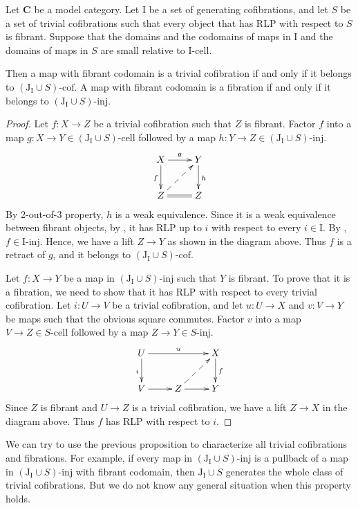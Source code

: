 \documentclass{tac}
\theoremstyle{definition}
\newcommand{\cat}[1]{\mathbf{#1}}
\newcommand{\C}{\cat{C}}
\newcommand{\I}{\mathrm{I}}
\newcommand{\J}{\mathrm{J}}
\newcommand{\class}[2]{#1\text{-}\mathrm{#2}}
\newcommand{\Iinj}[1][\I]{\class{#1}{inj}}
\newcommand{\Icell}[1][\I]{\class{#1}{cell}}
\newcommand{\Icof}[1][\I]{\class{#1}{cof}}
\begin{document}
\begin{prop}
Let $\C$ be a model category.
Let $\I$ be a set of generating cofibrations, and let $S$ be a set of trivial cofibrations
such that every object that has RLP with respect to $S$ is fibrant.
Suppose that the domains and the codomains of maps in $\I$ and the domains of maps in $S$ are small relative to $\Icell$.

Then a map with fibrant codomain is a trivial cofibration if and only if it belongs to $\Icof[(\J_\I \cup S)]$.
A map with fibrant codomain is a fibration if and only if it belongs to $\Iinj[(\J_\I \cup S)]$.
\end{prop}
\begin{proof}
Let $f : X \to Z$ be a trivial cofibration such that $Z$ is fibrant.
Factor $f$ into a map $g : X \to Y \in \Icell[(\J_\I \cup S)]$ followed by a map $h : Y \to Z \in \Iinj[(\J_\I \cup S)]$.
\[ \xymatrix{ X \ar[r]^g \ar[d]_f & Y \ar[d]^h \\
              Z \ar@{=}[r] \ar@{-->}[ur] & Z
            } \]
By 2-out-of-3 property, $h$ is a weak equivalence.
Since it is a weak equivalence between fibrant objects, by , it has RLP up to $i$ with respect to every $i \in \I$.
By , $f \in \Iinj$.
Hence, we have a lift $Z \to Y$ as shown in the diagram above.
Thus $f$ is a retract of $g$, and it belongs to $\Icof[(\J_\I \cup S)]$.

Let $f : X \to Y$ be a map in $\Iinj[(\J_\I \cup S)]$ such that $Y$ is fibrant.
To prove that it is a fibration, we need to show that it has RLP with respect to every trivial cofibration.
Let $i : U \to V$ be a trivial cofibration, and let $u : U \to X$ and $v : V \to Y$ be maps such that the obvious square commutes.
Factor $v$ into a map $V \to Z \in \Icell[S]$ followed by a map $Z \to Y \in \Iinj[S]$.
\[ \xymatrix{ U \ar[rr]^u \ar[d]_i & & X \ar[d]^f \\
              V \ar[r] & Z \ar[r] \ar@{-->}[ur] & Y
            } \]
Since $Z$ is fibrant and $U \to Z$ is a trivial cofibration, we have a lift $Z \to X$ in the diagram above.
Thus $f$ has RLP with respect to $i$.
\end{proof}

We can try to use the previous proposition to characterize all trivial cofibrations and fibrations.
For example, if every map in $\Iinj[(\J_\I \cup S)]$ is a pullback of a map in $\Iinj[(\J_\I \cup S)]$ with fibrant codomain,
then $\J_\I \cup S$ generates the whole class of trivial cofibrations.
But we do not know any general situation when this property holds.
\end{document}
